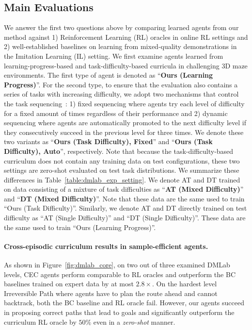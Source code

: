\documentclass{article}
\newcommand{\para}[1]{\paragraph{#1}\looseness=-1}
\newcommand{\cec}[0]{\mbox{CEC}\xspace}
\begin{document}
\subsection{Main Evaluations}
We answer the first two questions above by comparing learned agents from our method against 1) Reinforcement Learning (RL) oracles in online RL settings and 2) well-established baselines on learning from mixed-quality demonstrations in the Imitation Learning (IL) setting.
We first examine agents learned from learning-progress-based and task-difficulty-based curricula in challenging 3D maze environments.
The first type of agent is denoted as ``\textbf{Ours (Learning Progress)}''.
For the second type, to ensure that the evaluation also contains a series of tasks with increasing difficulty, we adopt two mechanisms that control the task sequencing~\citep{Narvekar2017AutonomousTS}: 1) fixed sequencing where agents try each level of difficulty for a fixed amount of times regardless of their performance and 2) dynamic sequencing where agents are automatically promoted to the next difficulty level if they consecutively succeed in the previous level for three times.
We denote these two variants as ``\textbf{Ours (Task Difficulty), Fixed}'' and ``\textbf{Ours (Task Difficulty), Auto}'', respectively.
Note that because the task-difficulty-based curriculum does not contain any training data on test configurations, these two settings are zero-shot evaluated on test task distributions. We summarize these differences in Table~\ref{table:dmlab_exp_setting}.
We denote AT and DT trained on data consisting of a mixture of task difficulties as ``\textbf{AT (Mixed Difficulty)}'' and ``\textbf{DT (Mixed Difficulty)}''.
Note that these data are the same used to train ``Ours (Task Difficulty)''.
Similarly, we denote AT and DT directly trained on test difficulty as ``AT (Single Difficulty)'' and ``DT (Single Difficulty)''.
These data are the same used to train ``Ours (Learning Progress)''.

\vspace{-0.5em}
\para{Cross-episodic curriculum results in sample-efficient agents.} As shown in Figure~\ref{fig:dmlab_core},  on two out of three examined DMLab levels, \cec agents perform comparable to RL oracles and outperform the BC baselines trained on expert data by at most $2.8\times$.
On the hardest level Irreversible Path where agents have to plan the route ahead and cannot backtrack, both the BC baseline and RL oracle fail.
However, our agents succeed in proposing correct paths that lead to goals and significantly outperform the curriculum RL oracle by $50\%$ even in a \emph{zero-shot} manner.
\end{document}
